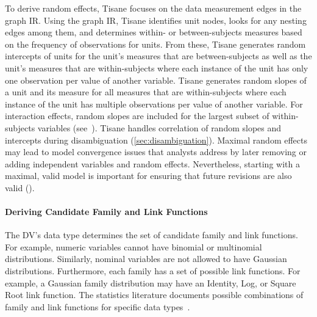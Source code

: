 To derive random effects, Tisane focuses on the data measurement edges in the
graph IR. Using the graph IR, Tisane identifies unit nodes, looks for any nesting
edges among them, and determines within- or between-subjects
measures based on the frequency of observations for units. %
From these, Tisane
generates random intercepts of units for the unit's measures that are between-subjects as well as the unit's measures that are within-subjects where each instance of the unit
has only one observation per value of another variable. Tisane generates random slopes of a unit and its measure for all measures
that are within-subjects where each instance of the unit has multiple
observations per value of another variable. For interaction effects, random
slopes are included for the largest subset of within-subjects variables (see~\cite{barr2013randomUpdated}). %
Tisane handles correlation of random slopes and intercepts during disambiguation (\autoref{sec:disambiguation}).
Maximal random effects may lead to model convergence issues that analysts
address by later removing or adding independent variables and random effects. Nevertheless, starting with
a maximal, valid model is important for ensuring that future revisions are also valid (\dcValidity).

\paragraph{Deriving Candidate Family and Link Functions} \label{sec:family_link_functions}
The DV's data type determines the set of candidate family and
link functions. For example, numeric %
variables cannot have
binomial or multinomial distributions. Similarly, nominal variables are not
allowed to have Gaussian distributions. Furthermore, each family has a set of
possible link functions. For example, a Gaussian family distribution may have an
Identity, Log, or Square Root link function. The statistics literature documents
    possible combinations of family and link functions for specific data
types~\cite{nelder1972generalized}.


